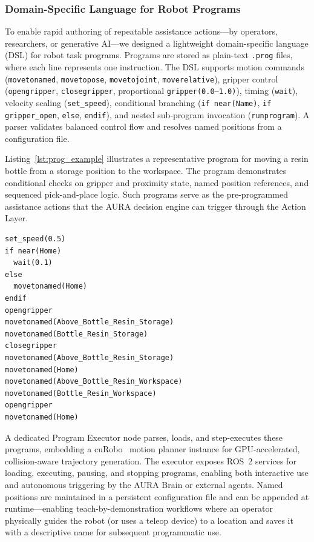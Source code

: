 \documentclass[sensors,article,submit,pdftex,moreauthors]{Definitions/mdpi}
\begin{document}
\subsubsection{Domain-Specific Language for Robot Programs}

To enable rapid authoring of repeatable assistance actions---by operators, researchers, or generative AI---we designed a lightweight domain-specific language (DSL) for robot task programs. Programs are stored as plain-text \texttt{.prog} files, where each line represents one instruction. The DSL supports motion commands (\texttt{movetonamed}, \texttt{movetopose}, \texttt{movetojoint}, \texttt{moverelative}), gripper control (\texttt{opengripper}, \texttt{closegripper}, proportional \texttt{gripper(0.0--1.0)}), timing (\texttt{wait}), velocity scaling (\texttt{set\_speed}), conditional branching (\texttt{if near(Name)}, \texttt{if gripper\_open}, \texttt{else}, \texttt{endif}), and nested sub-program invocation (\texttt{runprogram}). A parser validates balanced control flow and resolves named positions from a configuration file.

Listing~\ref{lst:prog_example} illustrates a representative program for moving a resin bottle from a storage position to the workspace. The program demonstrates conditional checks on gripper and proximity state, named position references, and sequenced pick-and-place logic. Such programs serve as the pre-programmed assistance actions that the AURA decision engine can trigger through the Action Layer.

\begin{lstlisting}[language={}, caption={Example robot program for material handling (abridged).}, label=lst:prog_example]
set_speed(0.5)
if near(Home)
  wait(0.1)
else
  movetonamed(Home)
endif
opengripper
movetonamed(Above_Bottle_Resin_Storage)
movetonamed(Bottle_Resin_Storage)
closegripper
movetonamed(Above_Bottle_Resin_Storage)
movetonamed(Home)
movetonamed(Above_Bottle_Resin_Workspace)
movetonamed(Bottle_Resin_Workspace)
opengripper
movetonamed(Home)
\end{lstlisting}

A dedicated Program Executor node parses, loads, and step-executes these programs, embedding a cuRobo~\cite{Liu2023} motion planner instance for GPU-accelerated, collision-aware trajectory generation. The executor exposes ROS~2 services for loading, executing, pausing, and stopping programs, enabling both interactive use and autonomous triggering by the AURA Brain or external agents. Named positions are maintained in a persistent configuration file and can be appended at runtime---enabling teach-by-demonstration workflows where an operator physically guides the robot (or uses a teleop device) to a location and saves it with a descriptive name for subsequent programmatic use.
\end{document}
